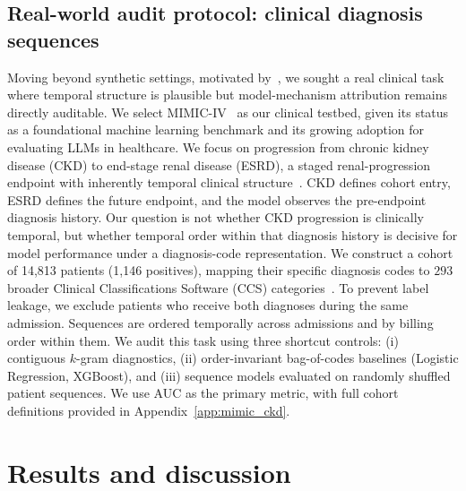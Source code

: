 \documentclass[fullpaper]{nldl}
\theoremstyle{plain}
\theoremstyle{definition}
\theoremstyle{remark}
\begin{document}
\subsection{Real-world audit protocol: clinical diagnosis sequences}
\label{subsec:mimic_ckd_protocol}
Moving beyond synthetic settings, motivated by~\citet{edelman2026order_specific_ehr}, we sought a real clinical task where temporal structure is plausible but model-mechanism attribution remains directly auditable. We select MIMIC-IV~\citep{johnson2024mimiciv31,johnson2023mimiciv} as our clinical testbed, given its status as a foundational machine learning benchmark and its growing adoption for evaluating LLMs in healthcare. We focus on progression from chronic kidney disease (CKD) to end-stage renal disease (ESRD), a staged renal-progression endpoint with inherently temporal clinical structure~\citep{kdigo2024ckd,sumida2017disease_trajectories_esrd}. CKD defines cohort entry, ESRD defines the future endpoint, and the model observes the pre-endpoint diagnosis history. Our question is not whether CKD progression is clinically temporal, but whether temporal order within that diagnosis history is decisive for model performance under a diagnosis-code representation. We construct a cohort of 14,813 patients (1,146 positives), mapping their specific diagnosis codes to $293$ broader Clinical Classifications Software (CCS) categories~\citep{hcup_ccs}. To prevent label leakage, we exclude patients who receive both diagnoses during the same admission. Sequences are ordered temporally across admissions and by billing order within them. We audit this task using three shortcut controls: (i) contiguous $k$-gram diagnostics, (ii) order-invariant bag-of-codes baselines (Logistic Regression, XGBoost), and (iii) sequence models evaluated on randomly shuffled patient sequences. We use AUC as the primary metric, with full cohort definitions provided in Appendix~\ref{app:mimic_ckd}.

\section{Results and discussion}
\label{sec:results}
\label{sec:discussion}
\end{document}
